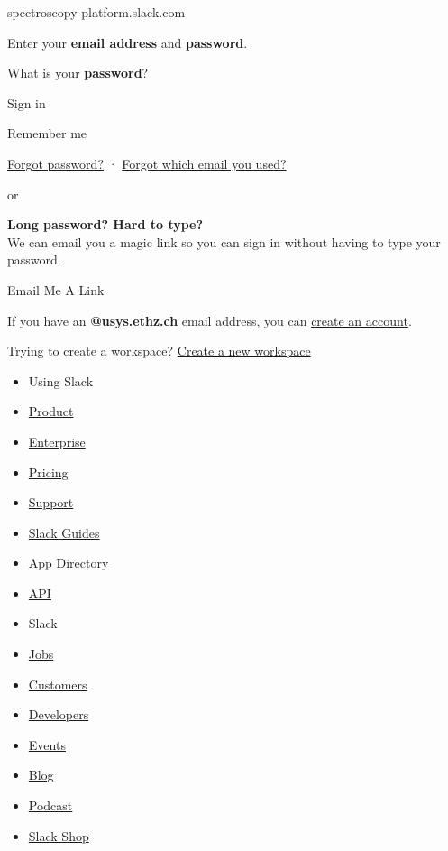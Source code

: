 spectroscopy-platform.slack.com

Enter your \textbf{email address} and \textbf{password}.

What is your \textbf{password}?

{Sign in}

Remember me

\href{/forgot}{Forgot password?} ·
\href{https://slack.com/get-started}{Forgot which email you used?}

\hypertarget{magicux5floginux5fcta}{}
or

\textbf{Long password? Hard to type?}\\
We can email you a magic link so you can sign in without having to type
your password.

Email Me A Link

If you have an \textbf{{ @usys.ethz.ch }} email address, you can
\href{/signup/}{create an account}.

Trying to create a workspace? \href{/create}{Create a new workspace}

\hypertarget{overlay}{}

\begin{itemize}
\tightlist
\item
  Using Slack
\item
  \href{/is}{Product}
\item
  \href{/enterprise}{Enterprise}
\item
  \href{/pricing?ui_step=28\&ui_element=5}{Pricing}
\item
  \href{https://get.slack.help/hc/en-us}{Support}
\item
  \href{/guides}{Slack Guides}
\item
  \href{/apps}{App Directory}
\item
  \href{https://api.slack.com/}{API}
\end{itemize}

\begin{itemize}
\tightlist
\item
  Slack
\item
  \href{/jobs}{Jobs}
\item
  \href{/customers}{Customers}
\item
  \href{/developers}{Developers}
\item
  \href{/events}{Events}
\item
  \href{https://slackhq.com/}{Blog}
\item
  \href{/podcast}{Podcast}
\item
  \href{https://slack.shop/}{Slack Shop}
\end{itemize}

